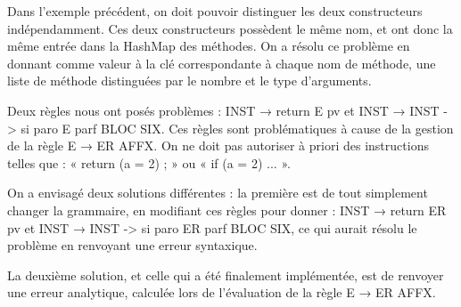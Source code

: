 Dans l'exemple précédent, on doit pouvoir distinguer les deux constructeurs
indépendamment. Ces deux constructeurs possèdent le même nom, et ont donc la
même entrée dans la HashMap des méthodes. On a résolu ce problème en donnant
comme valeur à la clé correspondante à chaque nom de méthode, une liste de
méthode distinguées par le nombre et le type d'arguments.



Deux règles nous ont posés problèmes : INST → return E pv et INST → INST -> si
paro  E  parf BLOC SIX. Ces règles sont problématiques à cause de la gestion de
la règle E → ER AFFX. On ne doit pas autoriser à priori des instructions telles
que : « return (a = 2) ; » ou « if (a = 2) {...} ».

On a envisagé deux solutions différentes : la première est de tout simplement
changer la grammaire, en modifiant ces règles pour donner : INST → return ER pv
et  INST → INST -> si paro  ER  parf BLOC SIX, ce qui aurait résolu le problème
en renvoyant une erreur syntaxique.

La deuxième solution, et celle qui a été finalement implémentée, est de renvoyer
une erreur analytique, calculée lors de l'évaluation de la règle E → ER AFFX.


